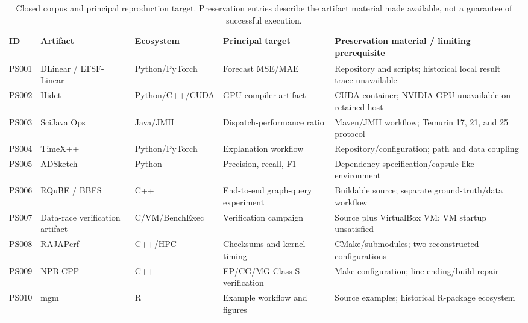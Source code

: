 \documentclass[a4paper,fleqn]{cas-dc}
\begin{document}
\begin{table}[t]
\centering
\caption{Closed corpus and principal reproduction target. Preservation entries describe the artifact material made available, not a guarantee of successful execution.}
\label{tab:2}
\fontsize{6}{7.2}\selectfont
\setlength{\tabcolsep}{1pt}
\begin{tabularx}{\textwidth}{@{}>{\raggedright\arraybackslash}p{}>{\raggedright\arraybackslash}p{}>{\raggedright\arraybackslash}p{}>{\raggedright\arraybackslash}p{}>{\raggedright\arraybackslash}X@{}}
\toprule
ID & Artifact & Ecosystem & Principal target & Preservation material / limiting prerequisite \\
\midrule
PS001 & DLinear / LTSF-Linear \citep{zeng2023dlinear,ltsflinearrepo} & Python/PyTorch & Forecast MSE/MAE & Repository and scripts; historical local result trace unavailable \\
PS002 & Hidet \citep{ding2023hidet} & Python/C++/CUDA & GPU compiler artifact & CUDA container; NVIDIA GPU unavailable on retained host \\
PS003 & SciJava Ops \citep{selzer2024scijavaops} & Java/JMH & Dispatch-performance ratio & Maven/JMH workflow; Temurin 17, 21, and 25 protocol \\
PS004 & TimeX++ \citep{liu2024timexpp} & Python/PyTorch & Explanation workflow & Repository/configuration; path and data coupling \\
PS005 & ADSketch \citep{chen2022adsketch} & Python & Precision, recall, F1 & Dependency specification/capsule-like environment \\
PS006 & RQuBE / BBFS \citep{chauhan2022rqube} & C++ & End-to-end graph-query experiment & Buildable source; separate ground-truth/data workflow \\
PS007 & Data-race verification artifact \citep{holter2025datarace} & C/VM/BenchExec & Verification campaign & Source plus VirtualBox VM; VM startup unsatisfied \\
PS008 & RAJAPerf \citep{pearce2024rajaperf} & C++/HPC & Checksums and kernel timing & CMake/submodules; two reconstructed configurations \\
PS009 & NPB-CPP \citep{griebler2018npbcpp} & C++ & EP/CG/MG Class S verification & Make configuration; line-ending/build repair \\
PS010 & mgm \citep{haslbeck2015mgm} & R & Example workflow and figures & Source examples; historical R-package ecosystem \\
\bottomrule
\end{tabularx}
\end{table}
\end{document}

